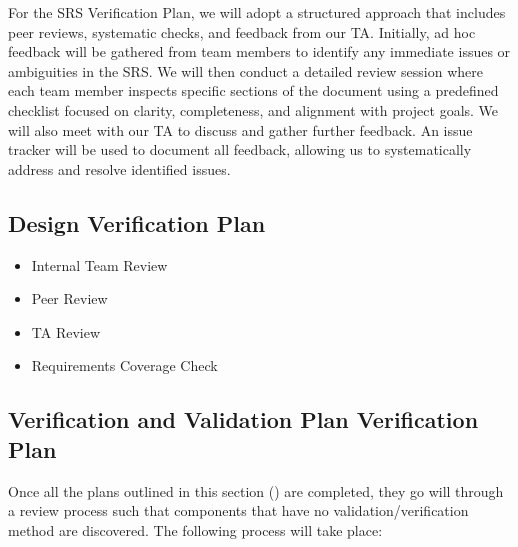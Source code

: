 \documentclass[12pt, titlepage]{article}
\begin{document}
For the SRS Verification Plan, we will adopt a structured approach that includes peer reviews, systematic checks, and feedback from our TA. Initially, ad hoc feedback will be gathered from team members to identify any immediate issues or ambiguities in the SRS. We will then conduct a detailed review session where each team member inspects specific sections of the document using a predefined checklist focused on clarity, completeness, and alignment with project goals. We will also meet with our TA to discuss and gather further feedback. An issue tracker will be used to document all feedback, allowing us to systematically address and resolve identified issues.

\subsection{Design Verification Plan}

\begin{itemize}
  \item Internal Team Review
  \item Peer Review
  \item TA Review
  \item Requirements Coverage Check
\end{itemize}

\subsection{Verification and Validation Plan Verification Plan}
\label{ssub:vnv_plan_verificaiton_plan}

Once all the plans outlined in this section () are completed, they go will through a review process such that components that have no validation/verification method are discovered. The following process will take place:
\end{document}
